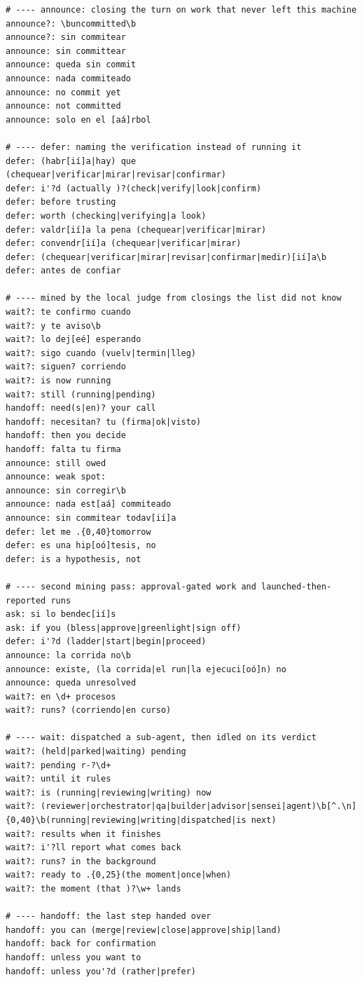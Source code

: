 \begin{verbatim}
# ---- announce: closing the turn on work that never left this machine
announce?: \buncommitted\b
announce?: sin commitear
announce: sin committear
announce: queda sin commit
announce: nada commiteado
announce: no commit yet
announce: not committed
announce: solo en el [aá]rbol

# ---- defer: naming the verification instead of running it
defer: (habr[ií]a|hay) que (chequear|verificar|mirar|revisar|confirmar)
defer: i'?d (actually )?(check|verify|look|confirm)
defer: before trusting
defer: worth (checking|verifying|a look)
defer: valdr[ií]a la pena (chequear|verificar|mirar)
defer: convendr[ií]a (chequear|verificar|mirar)
defer: (chequear|verificar|mirar|revisar|confirmar|medir)[ií]a\b
defer: antes de confiar

# ---- mined by the local judge from closings the list did not know
wait?: te confirmo cuando
wait?: y te aviso\b
wait?: lo dej[eé] esperando
wait?: sigo cuando (vuelv|termin|lleg)
wait?: siguen? corriendo
wait?: is now running
wait?: still (running|pending)
handoff: need(s|en)? your call
handoff: necesitan? tu (firma|ok|visto)
handoff: then you decide
handoff: falta tu firma
announce: still owed
announce: weak spot:
announce: sin corregir\b
announce: nada est[aá] commiteado
announce: sin commitear todav[ií]a
defer: let me .{0,40}tomorrow
defer: es una hip[oó]tesis, no
defer: is a hypothesis, not

# ---- second mining pass: approval-gated work and launched-then-reported runs
ask: si lo bendec[ií]s
ask: if you (bless|approve|greenlight|sign off)
defer: i'?d (ladder|start|begin|proceed)
announce: la corrida no\b
announce: existe, (la corrida|el run|la ejecuci[oó]n) no
announce: queda unresolved
wait?: en \d+ procesos
wait?: runs? (corriendo|en curso)

# ---- wait: dispatched a sub-agent, then idled on its verdict
wait?: (held|parked|waiting) pending
wait?: pending r-?\d+
wait?: until it rules
wait?: is (running|reviewing|writing) now
wait?: (reviewer|orchestrator|qa|builder|advisor|sensei|agent)\b[^.\n]{0,40}\b(running|reviewing|writing|dispatched|is next)
wait?: results when it finishes
wait?: i'?ll report what comes back
wait?: runs? in the background
wait?: ready to .{0,25}(the moment|once|when)
wait?: the moment (that )?\w+ lands

# ---- handoff: the last step handed over
handoff: you can (merge|review|close|approve|ship|land)
handoff: back for confirmation
handoff: unless you want to
handoff: unless you'?d (rather|prefer)


\end{verbatim}
